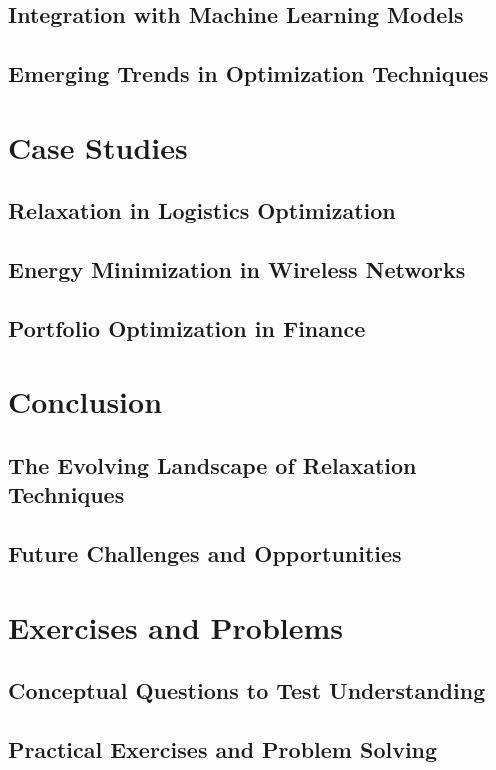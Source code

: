 \documentclass[12pt]{book} %
\begin{document}
\subsection{Integration with Machine Learning Models}
\subsection{Emerging Trends in Optimization Techniques}

\section{Case Studies}
\subsection{Relaxation in Logistics Optimization}
\subsection{Energy Minimization in Wireless Networks}
\subsection{Portfolio Optimization in Finance}

\section{Conclusion}
\subsection{The Evolving Landscape of Relaxation Techniques}
\subsection{Future Challenges and Opportunities}

\section{Exercises and Problems}
\subsection{Conceptual Questions to Test Understanding}
\subsection{Practical Exercises and Problem Solving}
\end{document}
